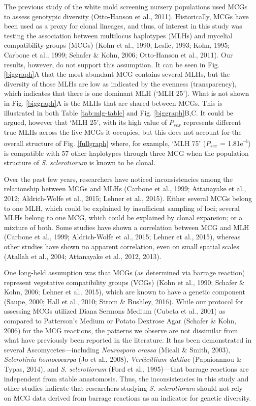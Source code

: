 \documentclass[fleqn,10pt,lineno]{wlpeerj} %
\theoremstyle{definition}
\theoremstyle{definition}
\theoremstyle{definition}
\theoremstyle{remark}
\begin{document}
The previous study of the white mold screening nursery populations used
MCGs to assess genotypic diversity (Otto-Hanson et al., 2011).
Historically, MCGs have been used as a proxy for clonal lineages, and
thus, of interest in this study was testing the association between
multilocus haplotypes (MLHs) and mycelial compatibility groups (MCGs)
(Kohn et al., 1990; Leslie, 1993; Kohn, 1995; Carbone et al., 1999;
Schafer \& Kohn, 2006; Otto-Hanson et al., 2011). Our results, however,
do not support this assumption. It can be seen in Fig. \ref{biggraph}A
that the most abundant MCG contains several MLHs, but the diversity of
those MLHs are low as indicated by the evenness (transparency), which
indicates that there is one dominant MLH (`MLH 25'). What is not shown
in Fig. \ref{biggraph}A is the MLHs that are shared between MCGs. This
is illustrated in both Table \ref{tab:mlg-table} and Fig.
\ref{biggraph}B,C. It could be argued, however that `MLH 25', with its
high value of \(P_{sex}\) represents different true MLHs across the five
MCGs it occupies, but this does not account for the overall structure of
Fig. \ref{fullgraph} where, for example, `MLH 75' (\(P_{sex}\) =
1.81e\textsuperscript{-4}) is compatible with 57 other haplotypes
through three MCG when the population structure of \emph{S.
sclerotiorum} is known to be clonal.

Over the past few years, researchers have noticed inconsistencies among
the relationship between MCGs and MLHs (Carbone et al., 1999; Attanayake
et al., 2012; Aldrich-Wolfe et al., 2015; Lehner et al., 2015). Either
several MCGs belong to one MLH, which could be explained by insufficient
sampling of loci; several MLHs belong to one MCG, which could be
explained by clonal expansion; or a mixture of both. Some studies have
shown a correlation between MCG and MLH (Carbone et al., 1999;
Aldrich-Wolfe et al., 2015; Lehner et al., 2015), whereas other studies
have shown no apparent correlation, even on small spatial scales
(Atallah et al., 2004; Attanayake et al., 2012, 2013).

One long-held assumption was that MCGs (as determined via barrage
reaction) represent vegetative compatibility groups (VCGs) (Kohn et al.,
1990; Schafer \& Kohn, 2006; Lehner et al., 2015), which are known to
have a genetic component (Saupe, 2000; Hall et al., 2010; Strom \&
Bushley, 2016). While our protocol for assessing MCGs utilized Diana
Sermons Medium (Cubeta et al., 2001) as compared to Patterson's Medium
or Potato Dextrose Agar (Schafer \& Kohn, 2006) for the MCG reactions,
the patterns we observe are not dissimilar from what have previously
been reported in the literature. It has been demonstrated in several
Ascomycetes---including \emph{Neurospora crassa} (Micali \& Smith,
2003), \emph{Sclerotinia homoeocarpa} (Jo et al., 2008),
\emph{Verticillium dahliae} (Papaioannou \& Typas, 2014), and \emph{S.
sclerotiorum} (Ford et al., 1995)---that barrage reactions are
independent from stable anastomosis. Thus, the inconsistencies in this
study and other studies indicate that researchers studying \emph{S.
sclerotiorum} should not rely on MCG data derived from barrage reactions
as an indicator for genetic diversity.
\end{document}

